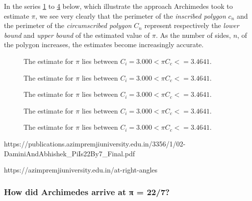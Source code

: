 \documentclass[
  a4paper,
]{article}
\begin{document}
In the series \cref{fig:six} to \cref{fig:forty-eight} below, which
illustrate the approach Archimedes took to estimate \(\pi\), we see very
clearly that the perimeter of the \emph{inscribed polygon} \(c_n\) and
the perimeter of the \emph{circumscribed polygon} \(C_n\) represent
respectively the \emph{lower bound} and \emph{upper bound} of the
estimated value of \(\pi\). As the number of sides, \(n\), of the
polygon increases, the estimates become increasingly accurate.

\begin{figure}
\centering

\caption{The estimate for \(\pi\) lies between
\(C_i = 3.000 < \pi C_c < = 3.4641\).}\label{fig:six}
\end{figure}

\begin{figure}
\centering

\caption{The estimate for \(\pi\) lies between
\(C_i = 3.000 < \pi C_c < = 3.4641\).}\label{fig:twelve}
\end{figure}

\begin{figure}
\centering

\caption{The estimate for \(\pi\) lies between
\(C_i = 3.000 < \pi C_c < = 3.4641\).}\label{fig:twenty-four}
\end{figure}

\begin{figure}
\centering

\caption{The estimate for \(\pi\) lies between
\(C_i = 3.000 < \pi C_c < = 3.4641\).}\label{fig:forty-eight}
\end{figure}

\begin{figure}
\centering

\caption{The estimate for \(\pi\) lies between
\(C_i = 3.000 < \pi C_c < = 3.4641\).}\label{fig:ninety-six}
\end{figure}

https://publications.azimpremjiuniversity.edu.in/3356/1/02-DaminiAndAbhishek\_PiIs22By7\_Final.pdf

https://azimpremjiuniversity.edu.in/at-right-angles

\subsubsection{How did Archimedes arrive at π =
22/7?}\label{how-did-archimedes-arrive-at-ux3c0-227}
\end{document}
